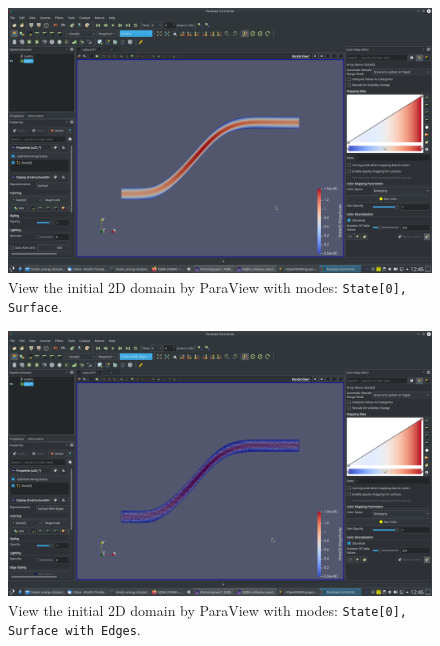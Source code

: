 \documentclass[onsided]{book}
\numberwithin{equation}{section}
\begin{document}
\begin{enumerate}
\begin{enumerate}
        \begin{figure}[H]
            \centering
            \includegraphics[height=0.44\textheight]{initial_domain_2D_State0_Surface}
            \caption{View the initial 2D domain by ParaView with modes: \texttt{State[0], Surface}.}
        \end{figure}
        
        \begin{figure}[H]
            \centering
            \includegraphics[height=0.44\textheight]{initial_domain_2D_State0_Surface_with_Edges}
            \caption{View the initial 2D domain by ParaView with modes: \texttt{State[0], Surface with Edges}.}
        \end{figure}
        

\end{enumerate}
\end{enumerate}
\end{document}

